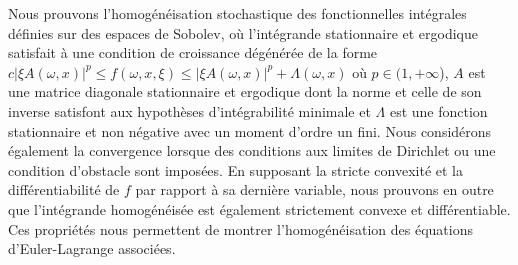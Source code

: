 \documentclass[JEP,XML,SOM,Unicode,published]{cedram}
\theoremstyle{definition}
\begin{document}
\begin{altabstract}
Nous prouvons l'homogénéisation stochastique des fonctionnelles intégrales définies sur des espaces de Sobolev, où l'intégrande stationnaire et ergodique satisfait à une condition de croissance dégénérée de la forme $c|\xi A(\omega,x)|^p\leq f(\omega,x,\xi)\leq |\xi A(\omega,x)|^p+\Lambda(\omega,x)$ où $p\in (1,+\infty$), $A$ est une matrice diagonale stationnaire et ergodique dont la norme et celle de son inverse satisfont aux hypothèses d'intégrabilité minimale et $\Lambda$ est une fonction stationnaire et non négative avec un moment d'ordre un fini. Nous considérons également la convergence lorsque des conditions aux limites de Dirichlet ou une condition d'obstacle sont imposées. En supposant la stricte convexité et la différentiabilité de $f$ par rapport à sa dernière variable, nous prouvons en outre que l'intégrande homogénéisée est également strictement convexe et différentiable. Ces propriétés nous permettent de montrer l'homogénéisation des équations d'Euler-Lagrange associées.
\end{altabstract}
\maketitle
\vspace*{-\baselineskip}
\tableofcontents
\end{document}
